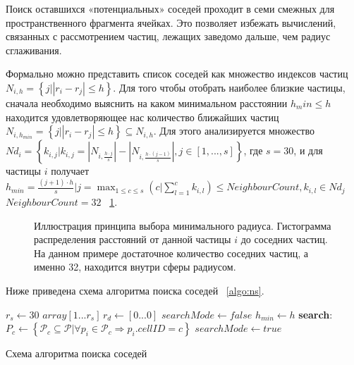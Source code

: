 Поиск оставшихся «потенциальных» соседей проходит в семи смежных для пространственного фрагмента ячейках. Это позволяет избежать вычислений, связанных с рассмотрением частиц, лежащих заведомо дальше, чем радиус сглаживания.

Формально можно представить список соседей как множество индексов частиц \(N_{i,h}=\left \{ j|\left | r_i-r_j \right | \leqslant h \right \}\). Для того чтобы отобрать наиболее близкие частицы, сначала необходимо выяснить на каком минимальном расстоянии \(h_min \leq  h\) находится удовлетворяющее нас количество ближайших частиц \(N_{i,h_{min}}=\left \{ j|\left | r_i-r_j \right | \leqslant h \right\} \subseteq N_{i,h}\). Для этого анализируется множество \(Nd_i=\left \{ k_{i,j}|k_{i,j}=\left | N_{i,\frac{h\cdot j}{s}} \right | - \left | N_{i,\frac{h\cdot (j-1)}{s}} \right |, j\in [1,...,s] \right \}\), где \(s=30\), и для частицы \(i\) получает \(h_{min}=\frac{(j+1)\cdot h}{s} |  j = \max_{1\leq c\leq s}\left ( c|\sum_{l=1}^{c} k_{i,l} \right )\leq NeighbourCount, k_{i,l} \in Nd_j\) \(NeighbourCount=32\) ~\ref{fig:ns_5}.
\begin{figure}[ht]
  \centerfloat{
    \texttt{[image: ns\_5]}
  }
  \caption{Иллюстрация принципа выбора минимального радиуса. Гистограмма распределения расстояний от данной частицы \(i\) до соседних частиц. На данном примере достаточное количество соседних частиц, а именно 32, находится внутри сферы радиусом.}
  \label{fig:ns_5}
\end{figure}
Ниже приведена схема алгоритма поиска соседей ~\ref{algo:ns}.

\begin{algorithm}[H]
  \label{algo:ns}
  \SetAlgoLined
  {
    $r_s  \leftarrow 30 $\;
    $array[1...r_s]\, r_d \leftarrow [0...0]$\;
    $searchMode \leftarrow false$\;
    $h_{min} \leftarrow h$\;
    \textbf{search}: \\
    {
      $P_c \leftarrow \left \{ \mathcal P_c \subseteq \mathcal P| \forall p_{i}\in \mathcal P_{c} \Rightarrow p_{i}.cellID = c \right \} $\;
      \;
      $searchMode \leftarrow true$\;
    }
  }
  \caption{Схема алгоритма поиска соседей}
\end{algorithm}

